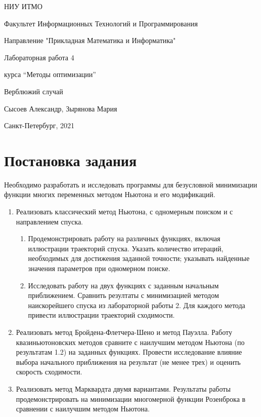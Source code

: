 \documentclass[12pt]{article}
\begin{document}
\begin{titlepage}

\thispagestyle{empty}

\centerline{НИУ ИТМО}
\centerline{Факультет Информационных Технологий и Программирования}
\centerline{Направление "Прикладная Математика и Информатика"}

\vfill

\centerline{\huge{Лабораторная работа 4}}
\centerline{\large{курса ``Методы оптимизации'' }}
\vspace{1cm} 
\centerline{\large{Верблюжий случай}}
\centerline{\large{Сысоев Александр, Зырянова Мария}}
\vfill

\centerline{Санкт-Петербург, 2021}
\clearpage
\end{titlepage}

\section{Постановка задания}

Необходимо разработать и исследовать программы для безусловной минимизации функции многих переменных методом Ньютона и его модификаций.

\begin{enumerate}
	\item Реализовать классический метод Ньютона, с одномерным поиском и с направлением спуска. 
		\begin{enumerate}
			\item Продемонстрировать работу на различных функциях, включая иллюстрации траекторий спуска. Указать количество итераций, необходимых для достижения заданной точности; указывать найденные значения параметров при одномерном поиске.
			\item Исследовать работу на двух функциях с заданным начальным приближением. Сравнить резултаты с минимизацией методом наискорейшего спуска из лабораторной работы 2. Для каждого метода привести иллюстрации траекторий сходимости.
		\end{enumerate}				
	\item Реализовать метод Бройдена-Флетчера-Шено и метод Пауэлла. Работу квазиньютоновских методов сравните с наилучшим методом Ньютона
(по результатам 1.2) на заданных функциях. Провести исследование влияние выбора начального приближения на результат (не менее трех) и оценить скорость сходимости.
	\item Реализовать метод Марквардта двумя вариантами. Результаты работы продемонстрировать на минимизации многомерной функции
Розенброка в сравнении с наилучшим методом Ньютона.
\end{enumerate}
\end{document}
